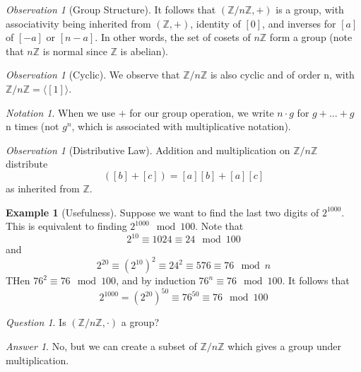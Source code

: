 \documentclass[12pt]{article}
\theoremstyle{definition}
\newtheorem{eg}[thm]{Example}
\theoremstyle{remark}
\newtheorem*{qst}{Question}
\newtheorem*{ans}{Answer}
\newtheorem{obs}[thm]{Observation}
\newtheorem{nota}[thm]{Notation}
\numberwithin{equation}{section}
\newcommand\Z{\mathbb Z}    %
\begin{document}
\vspace{15pt}

\begin{obs}[Group Structure]
        It follows that $(\Z/n\Z,+)$ is a group, with associativity being inherited from $(\Z,+)$, identity of $[0]$, and inverses for $[a]$ of $[-a]$ or $[n-a]$. In other words, the set of cosets of $n\Z$ form a group (note that $n\Z$ is normal since $\Z$ is abelian).
\end{obs}

\vspace{15pt}

\begin{obs}[Cyclic]
        We observe that $\Z/n\Z$ is also cyclic and of order n, with $\Z/n\Z = \langle [1] \rangle$.
\end{obs}


\vspace{15pt}

\begin{nota}
        When we use $+$ for our group operation, we write $n\cdot g$ for $g+...+g$ n times (not $g^n$, which is associated with multiplicative notation).
\end{nota}


\vspace{15pt}

\begin{obs}[Distributive Law]
        Addition and multiplication on $\Z/n\Z$ distribute \begin{equation}
                [a]([b]+[c])=[a][b]+[a][c]
        \end{equation}
        as inherited from $\Z$.
\end{obs}

\vspace{15pt}

\begin{eg}[Usefulness]
        Suppose we want to find the last two digits of $2^{1000}$. This is equivalent to finding $2^{1000} \mod 100$. Note that $$2^{10} \equiv 1024 \equiv 24 \mod 100$$ and $$2^{20} \equiv (2^{10})^2 \equiv 24^2 \equiv 576 \equiv 76 \mod n$$ THen $76^2 \equiv 76 \mod 100$, and by induction $76^n \equiv 76 \mod 100$. It follows that $$2^{1000} = (2^{20})^50 \equiv 76^{50} \equiv 76 \mod 100$$
\end{eg}


\vspace{15pt}

\begin{qst}
        Is $(\Z/n\Z, \cdot)$ a group?
\end{qst}
\begin{ans}
        No, but we can create a subset of $\Z/n\Z$ which gives a group under multiplication.
\end{ans}
\end{document}
